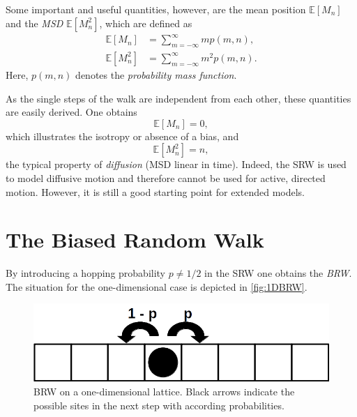 Some important and useful quantities, however, are the mean position \mbox{$\mathbb{E}\left[M_n\right]$} and the \textit{\ac{MSD}} \mbox{$\mathbb{E}\left[M^2_n\right]$}, which are defined as
\begin{equation}
 \begin{aligned}
  \mathbb{E}\left[M_n\right]&=\sum^\infty_{m=-\infty}mp\left(m,n\right),
  \\
  \mathbb{E}\left[M^2_n\right]&=\sum^\infty_{m=-\infty}m^2p\left(m,n\right).
 \end{aligned}
\end{equation}
Here, $p\left(m,n\right)$ denotes the \textit{probability mass function}.

As the single steps of the walk are independent from each other, these quantities are easily derived. One obtains
\begin{equation*}
 \mathbb{E}\left[M_n\right]=0,
\end{equation*}
which illustrates the isotropy or absence of a bias, and
\begin{equation*}
 \mathbb{E}\left[M^2_n\right]=n,
\end{equation*}
the typical property of \textit{diffusion} (\acs{MSD} linear in time). Indeed, the \acs{SRW} is used to model diffusive motion \cite{codling:2008} and therefore cannot be used for active, directed motion. However, it is still a good starting point for extended models.

\section{The Biased Random Walk}
By introducing a hopping probability $p \neq 1/2$ in the \acs{SRW} one obtains the \textit{\ac{BRW}}. The situation for the one-dimensional case is depicted in \autoref{fig:1DBRW}.

\begin{figure}[bth]
 \myfloatalign
 \includegraphics[width=0.8\linewidth]{gfx/1DBRW}
 \caption[\acs{BRW} on a one-dimensional lattice]{\acs{BRW} on a one-dimensional lattice. Black arrows indicate the possible sites in the next step with according probabilities.}\label{fig:1DBRW}
\end{figure}

